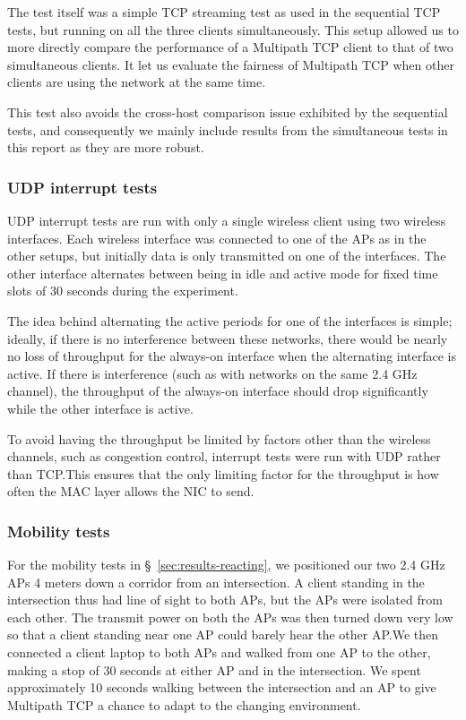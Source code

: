 The test itself was a simple TCP streaming test as used in the sequential TCP
tests, but running on all the three clients simultaneously. This setup allowed
us to more directly compare the performance of a Multipath TCP client to that of
two simultaneous clients. It let us evaluate the fairness of Multipath TCP when
other clients are using the network at the same time.

This test also avoids the cross-host comparison issue exhibited by the
sequential tests, and consequently we mainly include results from the
simultaneous tests in this report as they are more robust.

\subsubsection{UDP interrupt tests}
\label{sec:met:setups:intudp}
UDP interrupt tests are run with only a single wireless client using two
wireless interfaces. Each wireless interface was connected to one of the APs as
in the other setups, but initially data is only transmitted on one of the
interfaces.  The other interface alternates between being in idle and active
mode for fixed time slots of 30 seconds during the experiment.

The idea behind alternating the active periods for one of the interfaces is
simple; ideally, if there is no interference between these networks, there would
be nearly no loss of throughput for the always-on interface when the alternating
interface is active. If there is interference (such as with networks on the same
2.4 GHz channel), the throughput of the always-on interface should drop
significantly while the other interface is active.

To avoid having the throughput be limited by factors other than the wireless
channels, such as congestion control, interrupt tests were run with UDP rather
than TCP.\@ This ensures that the only limiting factor for the throughput is how
often the MAC layer allows the NIC to send.

\subsubsection{Mobility tests}
\label{sec:met:setups:mobility}
For the mobility tests in \S~\ref{sec:results-reacting}, we positioned our two
2.4 GHz APs 4 meters down a corridor from an intersection. A client standing in
the intersection thus had line of sight to both APs, but the APs were isolated
from each other. The transmit power on both the APs was then turned down very
low so that a client standing near one AP could barely hear the other AP.\@ We
then connected a client laptop to both APs and walked from one AP to the other,
making a stop of 30 seconds at either AP and in the intersection. We spent
approximately 10 seconds walking between the intersection and an AP to give
Multipath TCP a chance to adapt to the changing environment.

